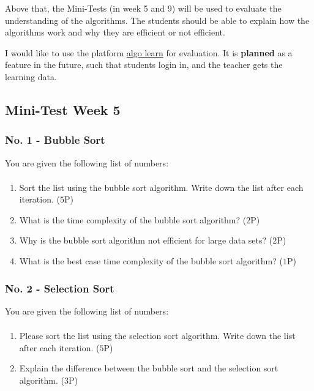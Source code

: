 \documentclass[10pt, oneside]{article}
\theoremstyle{remark}
\begin{document}
Above that, the Mini-Tests (in week 5 and 9) will be used to evaluate the understanding of the algorithms. The students should be able to explain how the algorithms work and why they are efficient or not efficient. 

\begin{tcolorbox}
  I would like to use the platform \href{https://tcs.uni-frankfurt.de/algo-learn-testing/refs_heads_feat-bubbleSort/en}{algo learn} for evaluation. It is \textbf{planned} as a feature in the future, such that students login in, and the teacher gets the learning data.
\end{tcolorbox}

\subsection{Mini-Test Week 5}
\subsubsection{No. 1 - Bubble Sort}
You are given the following list of numbers: 
\begin{align*}
  [5, 3, 8, 2, 1, 4, 7, 6]
\end{align*}
\begin{enumerate}
  \item Sort the list using the bubble sort algorithm. Write down the list after each iteration. ($5$P)
  \item What is the time complexity of the bubble sort algorithm? ($2$P)
  \item Why is the bubble sort algorithm not efficient for large data sets? ($2$P)
  \item What is the best case time complexity of the bubble sort algorithm? ($1$P)
\end{enumerate}

\subsubsection{No. 2 - Selection Sort}
You are given the following list of numbers:
\begin{align*}
  [12, 3, 5, 7, 1, 9, 4, 6]
\end{align*}
\begin{enumerate}
  \item Please sort the list using the selection sort algorithm. Write down the list after each iteration. ($5$P)
  \item Explain the difference between the bubble sort and the selection sort algorithm. ($3$P)
\end{enumerate}
\end{document}
